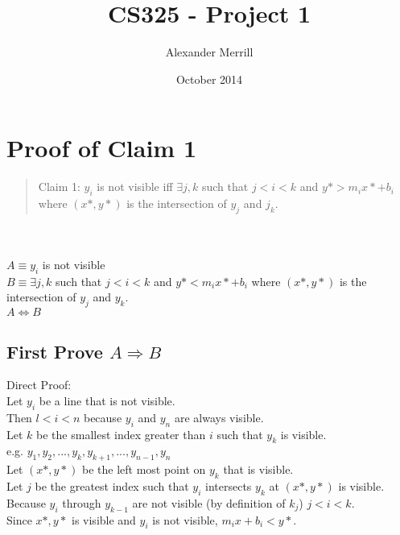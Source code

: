 \documentclass{article}
\title{CS325 - Project 1}
\author{Alexander Merrill}
\date{October 2014}
\begin{document}
\maketitle

\section*{Proof of Claim 1}

\begin{quote}
Claim 1: $y_i$ is not visible iff $\exists j,k$ such that $j < i < k$ and $y* > m_i x* + b_i$ where $(x*,y*)$ is the intersection of $y_j$ and $j_k$.
\end{quote}\\
\\
$A \equiv y_i$ is not visible\\
$B \equiv \exists j,k$ such that $j < i < k$ and $y* < m_i x* + b_i$ where $(x*,y*)$ is the intersection of $y_j$ and $y_k$.\\
$A \Leftrightarrow B$

\subsection*{First Prove $A \Rightarrow B$}
Direct Proof:\\
Let $y_i$ be a line that is not visible.\\
Then $l < i < n$ because $y_i$ and $y_n$ are always visible.\\
Let $k$ be the smallest index greater than $i$ such that $y_k$ is visible.\\
e.g. $y_1,y_2,...,y_k,y_{k+1},...,y_{n-1},y_n$\\
Let $(x*,y*)$ be the left most point on $y_k$ that is visible.\\
Let $j$ be the greatest index such that $y_i$ intersects $y_k$ at $(x*,y*)$ is visible.\\
Because $y_i$ through $y_{k-1}$ are not visible (by definition of $k_j$) $j < i < k$.\\
Since $x*,y*$ is visible and $y_i$ is not visible, $m_i x + b_i < y*$.
\end{document}
